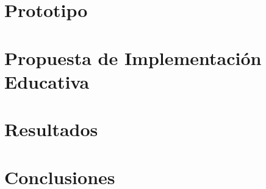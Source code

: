 \documentclass[10pt,spanish,fleqn,openany,twoside,letterpaper]{book}
\begin{document}
{\chapter{Prototipo}
    
\chapter{Propuesta de Implementación Educativa}
    
\chapter{Resultados}
    
\chapter{Conclusiones}
    

\begin{appendix}
\end{appendix}


\let\OLDthebibliography=\thebibliography
\def\thebibliography#1{\OLDthebibliography{#1}}
{\scriptsize
\pagestyle{plain}

\nocite{*}
\clearpage
}}
\end{document}
